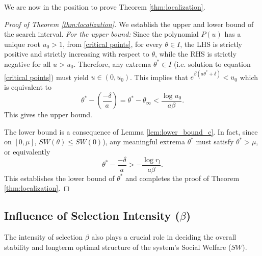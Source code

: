 \documentclass{article}
\newtheorem{corollary}{Corollary}
\begin{document}

We are now in the position to prove Theorem \ref{thm:localization}.
\begin{proof}[Proof of Theorem \ref{thm:localization}]

We establish the upper and lower bound of the search interval.
\textit{For the upper bound:}  Since the polynomial $P(u)$ has a unique root $u_0 > 1$, from \eqref{critical points}, for every $\theta \in I$, the LHS is strictly positive and strictly increasing with respect to $\theta$, while the RHS is strictly negative for all $u > u_0$. Therefore, any extrema $\theta^* \in I$ (i.e. solution to equation \eqref{critical points}) must yield $u \in (0, u_0)$. This implies that $ e^{\beta(a\theta^* + \delta)} < u_0$
which is equivalent to
\begin{equation*}
\theta^* - \left( \frac{-\delta}{a} \right) = \theta^* - \theta_{\infty} < \frac{\log u_0}{a\beta}.  
\end{equation*}
This gives the upper bound.

The lower bound is a consequence of Lemma \ref{lem:lower_bound_c}. In fact, since on $[0, \mu]$, $SW(\theta)\leq SW(0)$), any meaningful extrema $\theta^*$ must satisfy $\theta^* > \mu$, or equivalently
\[
\theta^* - \frac{-\delta}{a} > -\frac{\log r_l}{a\beta}.
\]
This establishes the lower bound of $\theta^*$ and completes the proof of Theorem \ref{thm:localization}.
\end{proof}
\subsection{Influence of Selection Intensity (\texorpdfstring{$ \beta $}))} \label{beta_theory}
The intensity of selection $\beta$ also plays a crucial role in deciding the overall stability and long\text{-}term optimal structure of the system's Social Welfare ($SW$).
\end{document}
